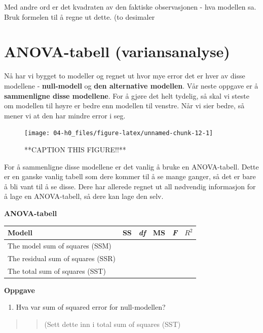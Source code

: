 \documentclass[
]{book}
\providecommand{\tightlist}{%
  \setlength{\itemsep}{0pt}\setlength{\parskip}{0pt}}
\begin{document}
Med andre ord er det kvadraten av den faktiske observasjonen - hva modellen sa. Bruk formelen til å regne ut dette. (to desimaler

\hypertarget{anova-tabell-variansanalyse}{%
\section{ANOVA-tabell (variansanalyse)}\label{anova-tabell-variansanalyse}}

Nå har vi bygget to modeller og regnet ut hvor mye error det er hver av disse modellene - \textbf{null-modell} og \textbf{den alternative modellen}. Vår neste oppgave er å \textbf{sammenligne disse modellene}. For å gjøre det helt tydelig, så skal vi steste om modellen til høyre er bedre enn modellen til venstre. Når vi sier bedre, så mener vi at den har mindre error i seg.

\begin{figure}

{\centering \texttt{[image: 04-h0\_files/figure-latex/unnamed-chunk-12-1]} 

}

\caption{**CAPTION THIS FIGURE!!**}\label{fig:unnamed-chunk-12}
\end{figure}

For å sammenligne disse modellene er det vanlig å bruke en ANOVA-tabell. Dette er en ganske vanlig tabell som dere kommer til å se mange ganger, så det er bare å bli vant til å se disse. Dere har allerede regnet ut all nødvendig informasjon for å lage en ANOVA-tabell, så dere kan lage den selv.

\textbf{ANOVA-tabell}

\begin{longtable}[]{@{}llllll@{}}
\toprule
Modell & SS & \emph{df} & MS & \emph{F} & \(R^2\)\tabularnewline
\midrule
\endhead
The model sum of squares (SSM) & & & & &\tabularnewline
The residual sum of squares (SSR) & & & & &\tabularnewline
The total sum of squares (SST) & & & & &\tabularnewline
\bottomrule
\end{longtable}

\textbf{Oppgave}

\begin{enumerate}
\def\labelenumi{\alph{enumi}.}
\tightlist
\item
  Hva var sum of squared error for null-modellen?
\end{enumerate}

\begin{quote}
\begin{quote}
(Sett dette inn i total sum of squares (SST)
\end{quote}
\end{quote}
\end{document}

